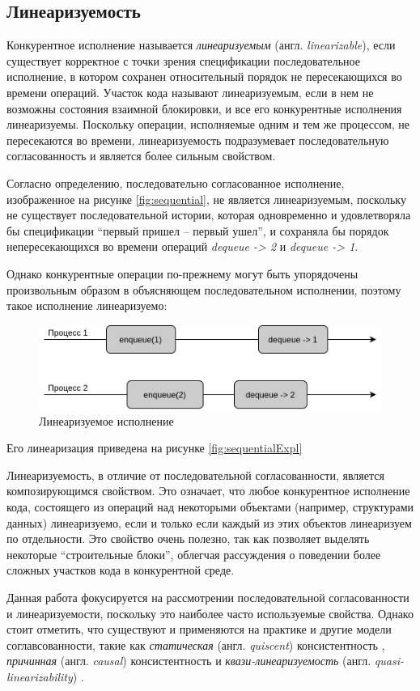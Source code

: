 \documentclass[14pt, openany]{book}
\begin{document}
\subsection{Линеаризуемость}
Конкурентное исполнение называется \textit{линеаризуемым} (англ. \textit{linearizable}), если существует корректное с точки зрения спецификации последовательное исполнение, в котором сохранен относительный порядок не пересекающихся во времени операций. Участок кода называют линеаризуемым, если в нем не возможны состояния взаимной блокировки, и все его конкурентные исполнения линеаризуемы. Поскольку операции, исполняемые одним и тем же процессом, не пересекаются во времени, линеаризуемость подразумевает последовательную согласованность и является более сильным свойством. \cite{linearizable} \par
Согласно определению, последовательно согласованное исполнение, изображенное на рисунке \ref{fig:sequential}, не является линеаризуемым, поскольку не существует последовательной истории, которая одновременно и удовлетворяла бы спецификации ``первый пришел -- первый ушел'', и сохраняла бы порядок непересекающихся во времени операций \textit{dequeue -> 2} и \textit{dequeue -> 1}.\par
Однако конкурентные операции по-прежнему могут быть упорядочены произвольным образом в объясняющем последовательном исполнении, поэтому такое исполнение линеаризуемо:

\begin{figure}[h]
\caption{Линеаризуемое исполнение}
\vspace{2mm}
\centering
\includegraphics[scale=0.4]{Linearizable.jpg}
\end{figure}
\noindent Его линеаризация приведена на рисунке \ref{fig:sequentialExpl}\par

Линеаризуемость, в отличие от последовательной согласованности, является композирующимся свойством. \cite{linearizable} Это означает, что любое конкурентное исполнение кода, состоящего из операций над некоторыми объектами (например, структурами данных)  линеаризуемо, если и только если каждый из этих объектов линеаризуем по отдельности. Это свойство очень полезно, так как позволяет выделять некоторые ``строительные блоки'', облегчая рассуждения о поведении более сложных участков кода в конкурентной среде. \par
Данная работа фокусируется на рассмотрении последовательной согласованности и линеаризуемости, поскольку это наиболее часто используемые свойства. Однако стоит отметить, что существуют и применяются на практике и другие модели соглавсованности, такие как \textit{статическая} (англ. 
\textit{quiscent}) консистентность \cite{quiscent}, \textit{причинная} (англ. \textit{causal}) консистентность \cite{causal} и \textit{квази-линеаризуемость} (англ. \textit{quasi-linearizability}) \cite{quasi}.
\end{document}
